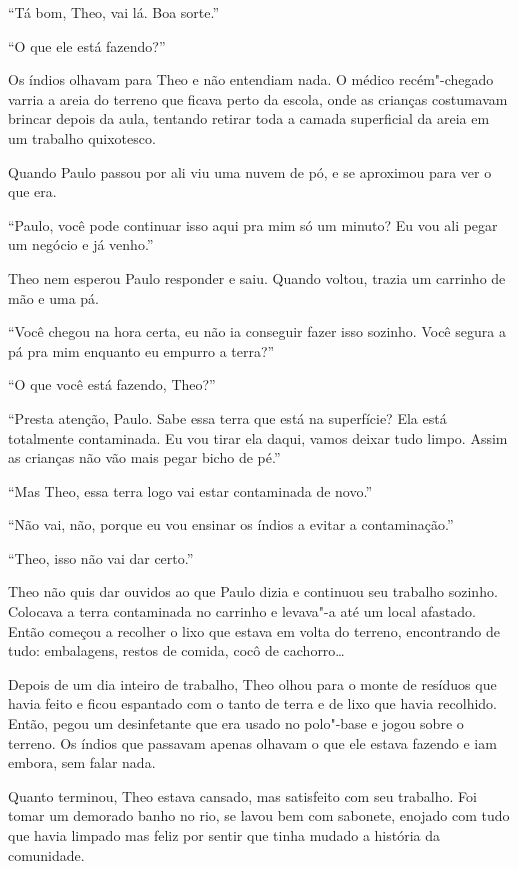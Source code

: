 ``Tá bom, Theo, vai lá. Boa sorte.''

\asterisc


``O que ele está fazendo?''

Os índios olhavam para Theo e não entendiam nada. O médico recém"-chegado
varria a areia do terreno que ficava perto da escola, onde as
crianças costumavam brincar depois da aula, tentando retirar toda a
camada superficial da areia em um trabalho quixotesco.

Quando Paulo passou por ali viu uma nuvem de pó, e se aproximou para ver
o que era.

``Paulo, você pode continuar isso aqui pra mim só um minuto? Eu vou ali
pegar um negócio e já venho.''

Theo nem esperou Paulo responder e saiu. Quando voltou, trazia um
carrinho de mão e uma pá.

``Você chegou na hora certa, eu não ia conseguir fazer isso sozinho.
Você segura a pá pra mim enquanto eu empurro a terra?''

``O que você está fazendo, Theo?''

``Presta atenção, Paulo. Sabe essa terra que está na superfície? Ela
está totalmente contaminada. Eu vou tirar ela daqui, vamos deixar tudo
limpo. Assim as crianças não vão mais pegar bicho de pé.''

``Mas Theo, essa terra logo vai estar contaminada de novo.''

``Não vai, não, porque eu vou ensinar os índios a evitar a
contaminação.''

``Theo, isso não vai dar certo.''

Theo não quis dar ouvidos ao que Paulo dizia e continuou seu trabalho
sozinho. Colocava a terra contaminada no carrinho e levava"-a até um
local afastado. Então começou a recolher o lixo que estava em volta do
terreno, encontrando de tudo: embalagens, restos de comida, cocô de
cachorro\ldots{}

Depois de um dia inteiro de trabalho, Theo olhou para o monte de
resíduos que havia feito e ficou espantado com o tanto de terra e de
lixo que havia recolhido. Então, pegou um desinfetante que era usado no
polo"-base e jogou sobre o terreno. Os índios que passavam apenas olhavam
o que ele estava fazendo e iam embora, sem falar nada.

Quanto terminou, Theo estava cansado, mas satisfeito com seu trabalho.
Foi tomar um demorado banho no rio, se lavou bem com sabonete, enojado
com tudo que havia limpado mas feliz por sentir que tinha mudado a
história da comunidade.

